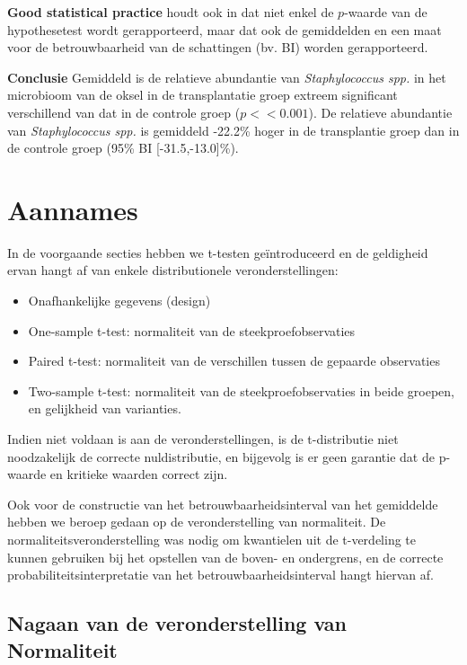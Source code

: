 \documentclass[
  12pt,dutch,coursenotes]{book}
\providecommand{\tightlist}{%
  \setlength{\itemsep}{0pt}\setlength{\parskip}{0pt}}
\theoremstyle{definition}
\theoremstyle{definition}
\theoremstyle{definition}
\theoremstyle{definition}
\theoremstyle{remark}
\begin{document}
\textbf{Good statistical practice} houdt ook in dat niet enkel de \(p\)-waarde van de hypothesetest wordt gerapporteerd, maar dat ook de gemiddelden en een maat voor de betrouwbaarheid van de schattingen (bv. BI) worden gerapporteerd.

\textbf{Conclusie}
Gemiddeld is de relatieve abundantie van \emph{Staphylococcus spp.} in het microbioom van de oksel in de transplantatie groep extreem significant verschillend van dat in de controle groep (\(p<<0.001\)). De relatieve abundantie van \emph{Staphylococcus spp.} is gemiddeld -22.2\% hoger in de transplantie groep dan in de controle groep (95\% BI {[}-31.5,-13.0{]}\%).

\hypertarget{aannames}{%
\section{Aannames}\label{aannames}}

In de voorgaande secties hebben we t-testen geïntroduceerd en de geldigheid ervan hangt af van enkele distributionele veronderstellingen:

\begin{itemize}
\tightlist
\item
  Onafhankelijke gegevens (design)
\item
  One-sample t-test: normaliteit van de steekproefobservaties
\item
  Paired t-test: normaliteit van de verschillen tussen de gepaarde observaties
\item
  Two-sample t-test: normaliteit van de steekproefobservaties in beide groepen, en gelijkheid van varianties.
\end{itemize}

Indien niet voldaan is aan de veronderstellingen, is de t-distributie niet noodzakelijk de correcte nuldistributie, en bijgevolg is er geen garantie dat de p-waarde en kritieke waarden correct zijn.

Ook voor de constructie van het betrouwbaarheidsinterval van het gemiddelde hebben we beroep gedaan op de veronderstelling van normaliteit. De normaliteitsveronderstelling was nodig om kwantielen uit de t-verdeling te kunnen gebruiken bij het opstellen van de boven- en ondergrens, en de correcte probabiliteitsinterpretatie van het betrouwbaarheidsinterval hangt hiervan af.

\hypertarget{nagaan-van-de-veronderstelling-van-normaliteit}{%
\subsection{Nagaan van de veronderstelling van Normaliteit}\label{nagaan-van-de-veronderstelling-van-normaliteit}}
\end{document}
